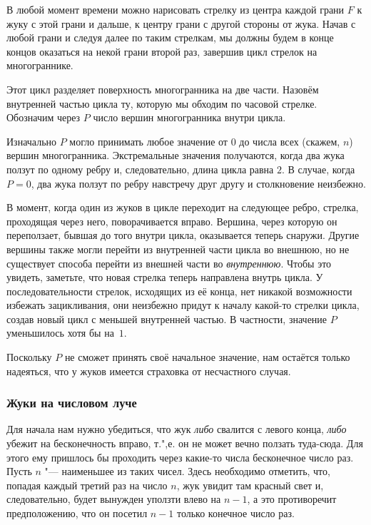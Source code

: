 \documentclass[twoside]{book}
\begin{document}
В любой момент времени можно нарисовать стрелку из центра каждой грани $F$ к жуку с этой грани и дальше, к центру грани с другой стороны от жука.
Начав с любой грани и следуя далее по таким стрелкам, мы должны будем в конце концов оказаться на некой грани второй раз, завершив цикл стрелок на многограннике.

Этот цикл разделяет поверхность многогранника на две части.
Назовём внутренней частью цикла ту, которую мы обходим по часовой стрелке.
Обозначим через $P$ число вершин многогранника внутри цикла.

Изначально $P$ могло принимать любое значение от $0$ до числа всех (скажем, $n$) вершин многогранника.
Экстремальные значения получаются, когда два жука ползут по одному ребру и, следовательно, длина цикла равна $2$.
В случае, когда $P=0$, два жука ползут по ребру навстречу друг другу и столкновение неизбежно.

В момент, когда один из жуков в цикле переходит на следующее ребро, стрелка, проходящая через него, поворачивается вправо.
Вершина, через которую он переползает, бывшая до того внутри цикла, оказывается теперь снаружи.
Другие вершины также могли перейти из внутренней части цикла во внешнюю, но не существует способа перейти из внешней части во \emph{внутреннюю}.
Чтобы это увидеть, заметьте, что новая стрелка теперь направлена внутрь цикла.
У последовательности стрелок, исходящих из её конца, нет никакой возможности избежать зацикливания, они неизбежно придут к началу какой-то стрелки цикла, создав новый цикл с меньшей внутренней частью.
В частности, значение $P$ уменьшилось хотя бы на~$1$.
{\par}

Поскольку $P$ не сможет принять своё начальное значение, нам остаётся только надеяться, что у жуков имеется страховка от несчастного случая.
\heart


\subsubsection*{Жуки на числовом луче}%

Для начала нам нужно убедиться, что жук \emph{либо} свалится с левого конца, \emph{либо} убежит на бесконечность вправо, т.",е. он не может вечно ползать туда-сюда.
Для этого ему пришлось бы проходить через какие-то числа бесконечное число раз.
Пусть $n$ "--- наименьшее из таких чисел.
Здесь необходимо отметить, что, попадая каждый третий раз на число $n$, жук увидит там красный свет и, следовательно, будет вынужден уползти влево на $n-1$, а это противоречит предположению, что он посетил $n-1$ только конечное число раз.
\end{document}
